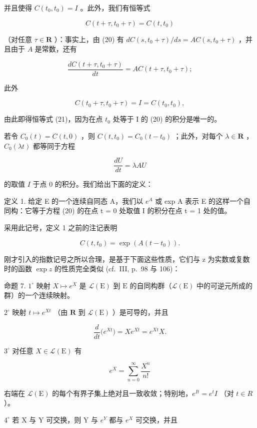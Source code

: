 并且使得 \(C(t_0, t_0) = I\) 。此外，我们有恒等式

\[
C (t + \tau , t _ {0} + \tau) = C (t, t _ {0})\tag{21}
\]

（对任意 \(\tau \in \mathbf{R}\) ）：事实上，由 (20) 有 \(dC(s, t_0 + \tau) / ds = AC(s, t_0 + \tau)\) ，并且由于 \(A\) 是常数，还有

\[
\frac {d C (t + \tau , t _ {0} + \tau)}{d t} = A C (t + \tau , t _ {0} + \tau);
\]

此外

\[
C (t _ {0} + \tau , t _ {0} + \tau) = I = C (t _ {0}, t _ {0}),
\]

由此即得恒等式 (21)，因为在点 \(t_{0}\) 处等于 I 的 (20) 的积分是唯一的。

若令 \(C_0(t) = C(t, 0)\) ，则 \(C(t, t_0) = C_0(t - t_0)\) ；此外，对每个 \(\lambda \in \mathbf{R}\) ，\(C_0(\lambda t)\) 都等同于方程

\[
\frac {d U}{d t} = \lambda A U\tag{22}
\]

的取值 \(I\) 于点 0 的积分。我们给出下面的定义：

定义 1. 给定 E 的一个连续自同态 A，我们以 \(e^{A}\) 或 exp A 表示 E 的这样一个自同构：它等于方程 (20) 的在点 t = 0 处取值 I 的积分在点 t = 1 处的值。

采用此记号，定义 1 之前的注记表明

\[
C (t, t _ {0}) = \exp \left(A (t - t _ {0})\right).\tag{23}
\]

刚才引入的指数记号之所以合理，是基于下面这些性质，它们与 z 为实数或复数时的函数 \(\exp z\) 的性质完全类似 (cf.~III, p.~98 与 106)：

命题 7. \(1^{\circ}\) 映射 \(X \mapsto e^{X}\) 是 \(\mathcal{L}(\mathrm{E})\) 到 \(\mathrm{E}\) 的自同构群（\(\mathcal{L}(\mathrm{E})\) 中的可逆元所成的群）的一个连续映射。

\(2^{\circ}\) 映射 \(t\mapsto e^{Xt}\) （由 \(\mathbf{R}\) 到 \(\mathcal{L}(\mathrm{E})\) ）是可导的，并且

\[
\frac {d}{d t} \big (e ^ {X t} \big) = X e ^ {X t} = e ^ {X t} X.\tag{24}
\]

\(3^{\circ}\) 对任意 \(X\in \mathcal{L}(\mathrm{E})\) 有

\[
e ^ {X} = \sum_ {n = 0} ^ {\infty} \frac {X ^ {n}}{n !}\tag{25}
\]

右端在 \(\mathcal{L}(\mathrm{E})\) 的每个有界子集上绝对且一致收敛；特别地，\(e^{It} = e^{t}I\) （对 \(t \in R\) ）。

\(4^{\circ}\) 若 X 与 Y 可交换，则 Y 与 \(e^{Y}\) 都与 \(e^{X}\) 可交换，并且


